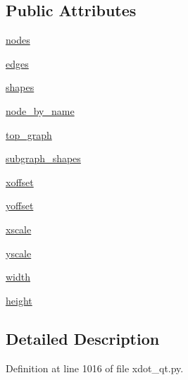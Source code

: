 \subsection*{Public Attributes}
\begin{DoxyCompactItemize}
\item 
\hyperlink{classsmacc__viewer_1_1xdot_1_1xdot__qt_1_1XDotParser_a4f80a4efa17b95021d3b9ac0798f21d3}{nodes}
\item 
\hyperlink{classsmacc__viewer_1_1xdot_1_1xdot__qt_1_1XDotParser_ace12c72e79acec94a77b786af0464e14}{edges}
\item 
\hyperlink{classsmacc__viewer_1_1xdot_1_1xdot__qt_1_1XDotParser_a7476ac352d9ef784270c6e58ec798e27}{shapes}
\item 
\hyperlink{classsmacc__viewer_1_1xdot_1_1xdot__qt_1_1XDotParser_ab2f76c5c90e5bfea7a8f539698180c97}{node\+\_\+by\+\_\+name}
\item 
\hyperlink{classsmacc__viewer_1_1xdot_1_1xdot__qt_1_1XDotParser_a0c1dc848b360f50e49aff2b0e0c9c0b1}{top\+\_\+graph}
\item 
\hyperlink{classsmacc__viewer_1_1xdot_1_1xdot__qt_1_1XDotParser_a3e206c4dae94296f11b63fd730aa485b}{subgraph\+\_\+shapes}
\item 
\hyperlink{classsmacc__viewer_1_1xdot_1_1xdot__qt_1_1XDotParser_ad38758cbc4a074812fb8579c3d13222a}{xoffset}
\item 
\hyperlink{classsmacc__viewer_1_1xdot_1_1xdot__qt_1_1XDotParser_a6a5c03b870038342b999c6507007beb8}{yoffset}
\item 
\hyperlink{classsmacc__viewer_1_1xdot_1_1xdot__qt_1_1XDotParser_a5e5258eb99c91ba4509361438b71768e}{xscale}
\item 
\hyperlink{classsmacc__viewer_1_1xdot_1_1xdot__qt_1_1XDotParser_a595f33b40408c747ff5bf18728a26b1b}{yscale}
\item 
\hyperlink{classsmacc__viewer_1_1xdot_1_1xdot__qt_1_1XDotParser_af11acc2d827c230ae2b02d0997aebe98}{width}
\item 
\hyperlink{classsmacc__viewer_1_1xdot_1_1xdot__qt_1_1XDotParser_a929356fa5526a2221034303b5891aca8}{height}
\end{DoxyCompactItemize}


\subsection{Detailed Description}


Definition at line 1016 of file xdot\+\_\+qt.\+py.



